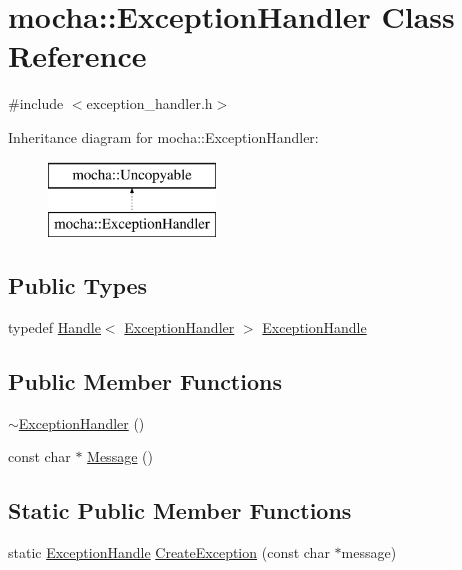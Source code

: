 \hypertarget{classmocha_1_1_exception_handler}{
\section{mocha::ExceptionHandler Class Reference}
\label{classmocha_1_1_exception_handler}
}


{\ttfamily \#include $<$exception\_\-handler.h$>$}

Inheritance diagram for mocha::ExceptionHandler:\begin{figure}[H]
\begin{center}
\leavevmode
\includegraphics[height=2.000000cm]{classmocha_1_1_exception_handler}
\end{center}
\end{figure}
\subsection*{Public Types}
\begin{DoxyCompactItemize}
\item 
typedef \hyperlink{classmocha_1_1_handle}{Handle}$<$ \hyperlink{classmocha_1_1_exception_handler}{ExceptionHandler} $>$ \hyperlink{classmocha_1_1_exception_handler_a438ecf67fc82c3eb61b570767795151f}{ExceptionHandle}
\end{DoxyCompactItemize}
\subsection*{Public Member Functions}
\begin{DoxyCompactItemize}
\item 
\hyperlink{classmocha_1_1_exception_handler_ab41aec92d3738929a8fa2f3ff6da354c}{$\sim$ExceptionHandler} ()
\item 
const char $\ast$ \hyperlink{classmocha_1_1_exception_handler_aca1a29f16dc8e1af2ab3551a8c0519f7}{Message} ()
\end{DoxyCompactItemize}
\subsection*{Static Public Member Functions}
\begin{DoxyCompactItemize}
\item 
static \hyperlink{classmocha_1_1_handle}{ExceptionHandle} \hyperlink{classmocha_1_1_exception_handler_a4a8479b68e91bcb753a961abf50f46f5}{CreateException} (const char $\ast$message)
\end{DoxyCompactItemize}
